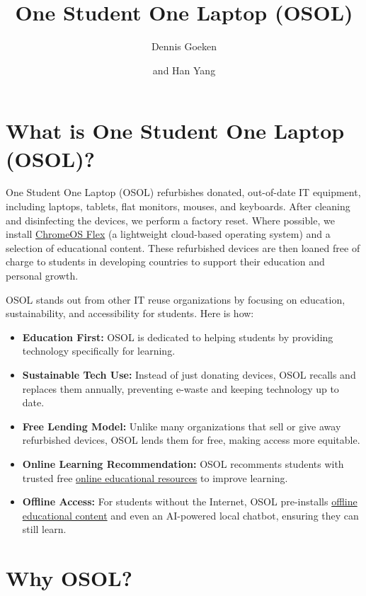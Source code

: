 \documentclass[a4paper,11pt]{article}
\title{One Student One Laptop (OSOL)}
\author{Dennis Goeken}
\author{and Han Yang}
\affiliation{IKAROS Shared Team, Riverty Group GmbH}
\begin{document}
\maketitle
\flushbottom
\listoftables
\listoffigures
\newpage

\section{What is One Student One Laptop (OSOL)?}
One Student One Laptop (OSOL) refurbishes donated, out-of-date IT equipment, including laptops, tablets, flat monitors, mouses, and keyboards. After cleaning and disinfecting the devices, we perform a factory reset. Where possible, we install \href{https://chromeos.google/products/chromeos-flex/}{ChromeOS Flex} (a lightweight cloud-based operating system) and a selection of educational content. These refurbished devices are then loaned free of charge to students in developing countries to support their education and personal growth.

OSOL stands out from other IT reuse organizations by focusing on education, sustainability, and accessibility for students. Here is how:
\begin{itemize}
	\item \textbf{Education First:} OSOL is dedicated to helping students by providing technology specifically for learning.
	\item \textbf{Sustainable Tech Use:} Instead of just donating devices, OSOL recalls and replaces them annually, preventing e-waste and keeping technology up to date.
	\item \textbf{Free Lending Model:} Unlike many organizations that sell or give away refurbished devices, OSOL lends them for free, making access more equitable.
	\item \textbf{Online Learning Recommendation:} OSOL recomments students with trusted free \hyperref[sec:online-education-content]{online educational resources} to improve learning.
	\item \textbf{Offline Access:} For students without the Internet, OSOL pre-installs \hyperref[sec:offline-education-content]{offline educational content} and even an AI-powered local  chatbot\cite{gpt4all-doc}, ensuring they can still learn.
\end{itemize}

\section{Why OSOL?}
\end{document}
